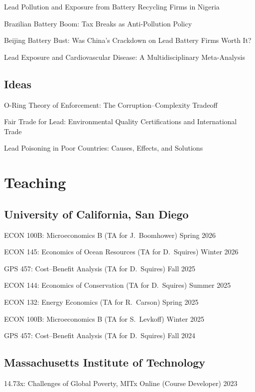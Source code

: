 \documentclass[12pt]{article}
\begin{document}
Lead Pollution and Exposure from Battery Recycling Firms in Nigeria

Brazilian Battery Boom: Tax Breaks as Anti-Pollution Policy

Beijing Battery Bust: Was China's Crackdown on Lead Battery Firms Worth It?

Lead Exposure and Cardiovascular Disease: A Multidisciplinary Meta-Analysis

\subsection*{\small Ideas}

O-Ring Theory of Enforcement: The Corruption--Complexity Tradeoff

Fair Trade for Lead: Environmental Quality Certifications and International Trade

Lead Poisoning in Poor Countries: Causes, Effects, and Solutions

\section*{Teaching}

\subsection*{\small University of California, San Diego}

ECON 100B: Microeconomics B (TA for J.\ Boomhower) \hfill Spring 2026

ECON 145: Economics of Ocean Resources (TA for D.\ Squires) \hfill Winter 2026

GPS 457: Cost--Benefit Analysis (TA for D.\ Squires) \hfill Fall 2025

ECON 144: Economics of Conservation (TA for D.\ Squires) \hfill Summer 2025

ECON 132: Energy Economics (TA for R.\ Carson) \hfill Spring 2025

ECON 100B: Microeconomics B (TA for S.\ Levkoff) \hfill Winter 2025

GPS 457: Cost--Benefit Analysis (TA for D.\ Squires) \hfill Fall 2024

\subsection*{\small Massachusetts Institute of Technology}

14.73x: Challenges of Global Poverty, MITx Online (Course Developer) \hfill 2023
\end{document}
